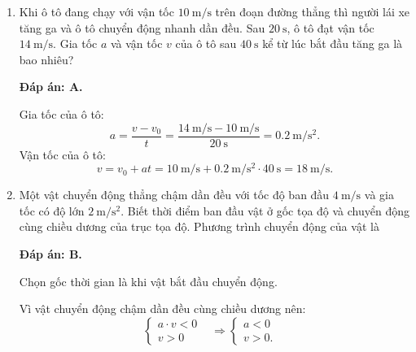 \begin{enumerate}[label=\bfseries Câu \arabic*:]
	\item {}
	
	{Khi ô tô đang chạy với vận tốc $\SI{10}{\meter/\second}$ trên đoạn đường thẳng thì người lái xe tăng ga và ô tô chuyển động nhanh dần đều. Sau $\SI{20}{\second}$, ô tô đạt vận tốc $\SI{14}{\meter/\second}$. Gia tốc $a$ và vận tốc $v$ của ô tô sau $\SI{40}{\second}$ kể từ lúc bắt đầu tăng ga là bao nhiêu?
	}
	\hideall
	{	\textbf{Đáp án: A.}
		
		Gia tốc của ô tô:
		$$a=\dfrac{v-v_0}{t}=\dfrac{\SI{14}{\meter/\second}-\SI{10}{\meter/\second}}{\SI{20}{\second}}=\SI{0.2}{\meter/\second^2}.$$
		Vận tốc của ô tô:
		$$v=v_0+at=\SI{10}{\meter/\second}+\SI{0.2}{\meter/\second^2}\cdot\SI{40}{\second}=\SI{18}{\meter/\second}.$$
	}
	\item {}
	
	{ Một vật chuyển động thẳng chậm dần đều với tốc độ ban đầu $\SI{4}{\meter/\second}$ và gia tốc có độ lớn $\SI{2}{\meter/\second^2}$. Biết thời điểm ban đầu vật ở gốc tọa độ và chuyển động cùng chiều dương của trục tọa độ. Phương trình chuyển động của vật là
	}
	\hideall
	{	\textbf{Đáp án: B.}
		
		Chọn gốc thời gian là khi vật bắt đầu chuyển động.
		
		Vì vật chuyển động chậm dần đều cùng chiều dương nên:
		\begin{equation*}
			\left\{\begin{array}{ll}{a\cdot v <0}&\\{v > 0}&\end{array}\right.\Rightarrow \left\{\begin{array}{ll}{a < 0}&\\{v > 0.}&\end{array}\right.
		\end{equation*}
		
}
\end{enumerate}
